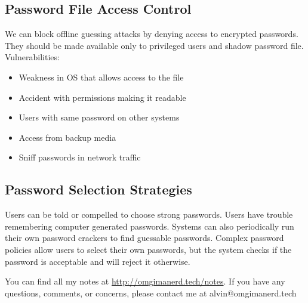 \documentclass{math}
\begin{document}
\subsection*{Password File Access Control}
We can block offline guessing attacks by denying access to encrypted passwords.
They should be made available only to privileged users and shadow password file.
Vulnerabilities:
\begin{itemize}
  \item Weakness in OS that allows access to the file
  \item Accident with permissions making it readable
  \item Users with same password on other systems
  \item Access from backup media
  \item Sniff passwords in network traffic
\end{itemize}

\subsection*{Password Selection Strategies}
Users can be told or compelled to choose strong passwords. Users have trouble
remembering computer generated passwords. Systems can also periodically run
their own password crackers to find guessable passwords. Complex password
policies allow users to select their own passwords, but the system checks if
the password is acceptable and will reject it otherwise.

\begin{center}
  You can find all my notes at \url{http://omgimanerd.tech/notes}. If you have
  any questions, comments, or concerns, please contact me at
  alvin@omgimanerd.tech
\end{center}
\end{document}
